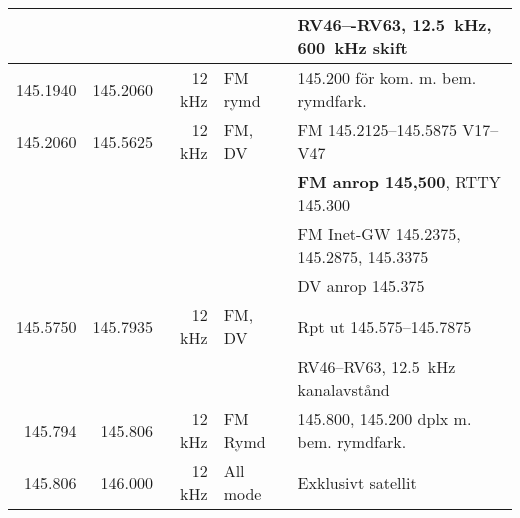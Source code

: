\begin{tabular}{rrrll}
         &           &         &              & RV46–-RV63, \SI{12,5}{\kilo\hertz}, \SI{600}{\kilo\hertz} skift \\ \hline
145.1940 & 145.2060  & 12 kHz  & FM rymd      & \num{145,200} för kom. m. bem. rymdfark.                        \\ \hline
145.2060 & 145.5625  & 12 kHz  & FM, DV       & FM \numrange{145,2125}{145,5875}  V17–V47                       \\
         &           &         &              & \textbf{FM anrop 145,500}, RTTY 145.300                         \\
         &           &         &              & FM Inet-GW \num{145,2375}, \num{145,2875}, \num{145,3375}       \\
         &           &         &              & DV anrop \num{145,375}                                          \\ \hline
145.5750 & 145.7935  & 12 kHz  & FM, DV       & Rpt ut \numrange{145,575}{145,7875}                             \\
         &           &         &              & RV46–RV63, \SI{12,5}{\kilo\hertz} kanalavstånd                  \\ \hline
145.794  & 145.806   & 12 kHz  & FM Rymd      & \num{145,800}, \num{145,200} dplx m. bem. rymdfark.              \\ \hline
145.806  & 146.000   & 12 kHz  & All mode     & Exklusivt satellit                                              \\ \hline
\end{tabular}

